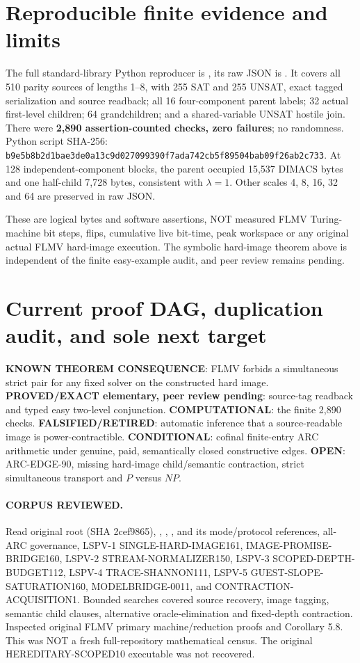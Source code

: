 \documentclass[11pt]{article}
\begin{document}
\section{Reproducible finite evidence and limits}
The full standard-library Python reproducer is
,
its raw JSON is
.
It covers all 510 parity sources of lengths 1--8, with
255 SAT and 255 UNSAT, exact tagged serialization and source
readback; all 16 four-component parent labels; 32 actual first-level
children; 64 grandchildren; and a shared-variable UNSAT hostile
join. There were \textbf{2,890 assertion-counted checks, zero failures};
no randomness. Python script SHA-256:
\texttt{b9e5b8b2d1bae3de0a13c9d027099390f7ada742cb5f89504bab09f26ab2c733}.
At 128 independent-component blocks, the parent occupied
15,537 DIMACS bytes and one half-child 7,728 bytes, consistent
with $\lambda=1$. Other scales 4, 8, 16, 32 and 64
are preserved in raw JSON.

These are logical bytes and software assertions, NOT measured
FLMV Turing-machine bit steps, flips, cumulative live bit-time,
peak workspace or any original actual FLMV hard-image execution.
The symbolic hard-image theorem above is independent of the
finite easy-example audit, and peer review remains pending.

\section{Current proof DAG, duplication audit, and sole next target}
\textbf{KNOWN THEOREM CONSEQUENCE}: FLMV forbids a simultaneous
strict pair for any fixed solver on the constructed hard image.
\textbf{PROVED/EXACT elementary, peer review pending}: source-tag
readback and typed easy two-level conjunction.
\textbf{COMPUTATIONAL}: the finite 2,890 checks.
\textbf{FALSIFIED/RETIRED}: automatic inference that a
source-readable image is power-contractible.
\textbf{CONDITIONAL}: cofinal finite-entry ARC arithmetic under
genuine, paid, semantically closed constructive edges.
\textbf{OPEN}: ARC-EDGE-90, missing hard-image child/semantic
contraction, strict simultaneous transport and $P$ versus $NP$.

\paragraph{CORPUS REVIEWED.}
Read original root  (SHA 2cef9865),
, , ,
 and its mode/protocol
references, all-ARC governance, LSPV-1 SINGLE-HARD-IMAGE161,
IMAGE-PROMISE-BRIDGE160, LSPV-2 STREAM-NORMALIZER150,
LSPV-3 SCOPED-DEPTH-BUDGET112, LSPV-4 TRACE-SHANNON111,
LSPV-5 GUEST-SLOPE-SATURATION160, MODELBRIDGE-0011,
and CONTRACTION-ACQUISITION1.
Bounded searches covered source recovery, image tagging,
semantic child clauses, alternative oracle-elimination and
fixed-depth contraction. Inspected original FLMV primary
machine/reduction proofs and Corollary 5.8. This was NOT
a fresh full-repository mathematical census. The original
HEREDITARY-SCOPED10 executable was not recovered.
\end{document}
